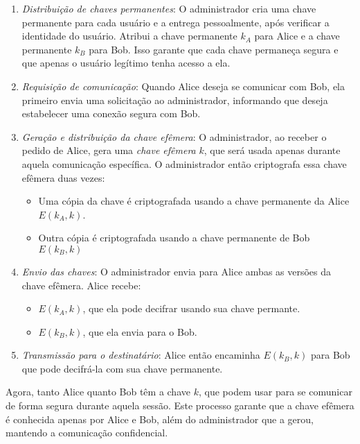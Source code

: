 \begin{enumerate}
\item {\em Distribuição de chaves permanentes}:
  O administrador cria uma chave permanente para cada usuário e a entrega pessoalmente, após verificar a identidade do usuário.
  Atribui a chave permanente $k_A$ para Alice e a chave permanente $k_B$ para Bob.
  Isso garante que cada chave permaneça segura e que apenas o usuário legítimo tenha acesso a ela.
  
\item {\em Requisição de comunicação}:
  Quando Alice deseja se comunicar com Bob, ela primeiro envia uma solicitação ao administrador, informando que deseja estabelecer uma conexão segura com Bob.

\item {\em Geração e distribuição da chave efêmera}:
  O administrador, ao receber o pedido de Alice, gera uma {\em chave efêmera} $k$, que será usada apenas durante aquela comunicação específica.
  O administrador então criptografa essa chave efêmera duas vezes:
  \begin{itemize}
  \item Uma cópia da chave é criptografada usando a chave permanente da Alice $E(k_A,k)$.
  \item Outra cópia é criptografada usando a chave permanente de Bob $E(k_B,k)$
  \end{itemize}
\item {\em Envio das chaves}:
  O administrador envia para Alice ambas as versões da chave efêmera.
  Alice recebe:
  \begin{itemize}
  \item $E(k_A,k)$, que ela pode decifrar usando sua chave permante.
  \item $E(k_B,k)$, que ela envia para o Bob.
  \end{itemize}
\item {\em Transmissão para o destinatário}:
  Alice então encaminha $E(k_B,k)$ para Bob que pode decifrá-la com sua chave permanente.
\end{enumerate}

Agora, tanto Alice quanto Bob têm a chave $k$, que podem usar para se comunicar de forma segura durante aquela sessão.
Este processo garante que a chave efêmera é conhecida apenas por Alice e Bob, além do administrador que a gerou, mantendo a comunicação confidencial.

\begin{center}
\end{center}

